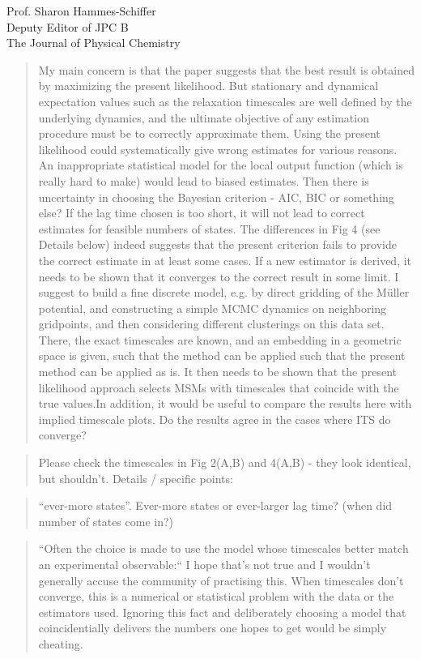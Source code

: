 \documentclass{letter}
\begin{document}
\begin{letter}{Prof. Sharon Hammes-Schiffer \\ Deputy Editor of JPC B \\ The Journal of Physical Chemistry}
\begin{quote}
My main concern is that the paper suggests that the best result is obtained by maximizing the present likelihood. But stationary and dynamical expectation values such as the relaxation timescales are well defined by the underlying dynamics, and the ultimate objective of any estimation procedure must be to correctly approximate them. Using the present likelihood could systematically give wrong estimates for various reasons. An inappropriate statistical model for the local output function (which is really hard to make) would lead to biased estimates. Then there is uncertainty in choosing the Bayesian criterion - AIC, BIC or something else? If the lag time chosen is too short, it will not lead to correct estimates for feasible numbers of states. The differences in Fig 4 (see Details below) indeed suggests that the present criterion fails to provide the correct estimate in at least some cases. If a new estimator is derived, it needs to be shown that it converges to the correct result in some limit. I suggest to build a fine discrete model, e.g. by direct gridding of the Müller potential, and constructing a simple MCMC dynamics on neighboring gridpoints, and then considering different clusterings on this data set. There, the exact timescales are known, and an embedding in a geometric space is given, such that the method can be applied such that the present method can be applied as is. It then needs to be shown that the present likelihood approach selects MSMs with timescales that coincide with the true values.In addition, it would be useful to compare the results here with implied timescale plots. Do the results agree in the cases where ITS do converge?
\end{quote}

\begin{quote}
Please check the timescales in Fig 2(A,B) and 4(A,B) - they look identical, but shouldn’t. Details / specific points:
\end{quote}

\begin{quote}
``ever-more states''. Ever-more states or ever-larger lag time? (when did number of states come in?)
\end{quote}

\begin{quote}
``Often the choice is made to use the model whose timescales better match an experimental observable:`` I hope that’s not true and I wouldn’t generally accuse the community of practising this. When timescales don’t converge, this is a numerical or statistical problem with the data or the estimators used. Ignoring this fact and deliberately choosing a model that coincidentially delivers the numbers one hopes to get would be simply cheating.
\end{quote}


\end{letter}
\end{document}
